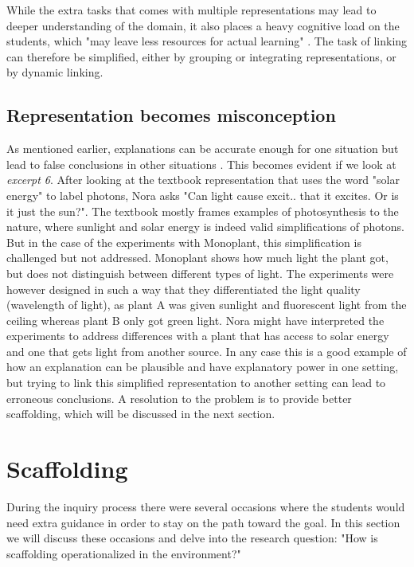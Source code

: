 While the extra tasks that comes with multiple representations may lead to deeper understanding of the domain, it also places a heavy cognitive load on the students, which "may leave less resources for actual learning" \citetext{Sweller, 1988, 1989, referenced in \citealp{van2006supporting}, p. 200}. The task of linking can therefore be simplified, either by grouping or integrating representations, or by dynamic linking. 

\subsection{Representation becomes misconception}
As mentioned earlier, explanations can be accurate enough for one situation but lead to false conclusions in other situations \citep{smith1994misconceptions}. This becomes evident if we look at \emph{excerpt 6}. After looking at the textbook representation that uses the word "solar energy" to label photons, Nora asks "Can light cause excit.. that it excites. Or is it just the sun?". The textbook mostly frames examples of photosynthesis to the nature, where sunlight and solar energy is indeed valid simplifications of photons. But in the case of the experiments with Monoplant, this simplification is challenged but not addressed. Monoplant shows how much light the plant got, but does not distinguish between different types of light. The experiments were however designed in such a way that they differentiated the light quality (wavelength of light), as plant A was given sunlight and fluorescent light from the ceiling whereas plant B only got green light. Nora might have interpreted the experiments to address differences with a plant that has access to solar energy and one that gets light from another source. In any case this is a good example of how an explanation can be plausible and have explanatory power in one setting, but trying to link this simplified representation to another setting can lead to erroneous conclusions. A resolution to the problem is to provide better scaffolding, which will be discussed in the next section.

\section{Scaffolding}
During the inquiry process there were several occasions where the students would need extra guidance in order to stay on the path toward the goal. In this section we will discuss these occasions and delve into the research question: "How is scaffolding operationalized in the environment?"

